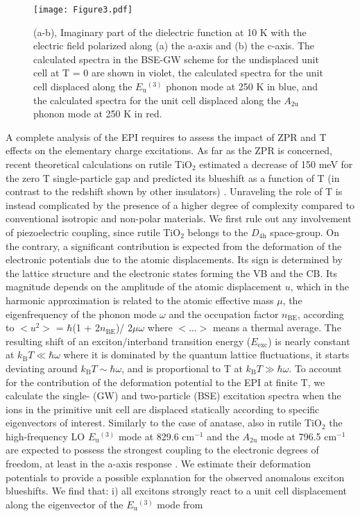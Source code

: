 \documentclass[aps,prl,twocolumn,amsfonts,nobibnotes,superscriptaddress,showpacs]{revtex4-1}
\begin{document}
\begin{figure}[b]
	\begin{center}
		\texttt{[image: Figure3.pdf]}
		\caption{(a-b), Imaginary part of the dielectric function at 10 K with the electric field polarized along (a) the a-axis and (b) the c-axis. The calculated spectra in the BSE-GW scheme for the undisplaced unit cell at T = 0 are shown in violet, the calculated spectra for the unit cell displaced along the $E\mathrm{_u}^{(3)}$ phonon mode at 250 K in blue, and the calculated spectra for the unit cell displaced along the $A\mathrm{_{2u}}$ phonon mode at 250 K in red.}
		\label{fig:Fig3}
	\end{center}
\end{figure}

A complete analysis of the EPI requires to assess the impact of ZPR and T effects on the elementary charge excitations. As far as the ZPR is concerned, recent theoretical calculations on rutile TiO$_2$ estimated a decrease of 150 meV for the zero T single-particle gap and predicted its blueshift as a function of T (in contrast to the redshift shown by other insulators)  \cite{monserrat2016correlation, giustino}. Unraveling the role of T is instead complicated by the presence of a higher degree of complexity compared to conventional isotropic and non-polar materials. We first rule out any involvement of piezoelectric coupling, since rutile TiO$_2$ belongs to the $D\mathrm{_{4h}}$ space-group. On the contrary, a significant contribution is expected from the deformation of the electronic potentials due to the atomic displacements. Its sign is determined by the lattice structure and the electronic states forming the VB and the CB. Its magnitude depends on the amplitude of the atomic displacement $u$, which in the harmonic approximation is related to the atomic effective mass $\mu$, the eigenfrequency of the phonon mode $\omega$ and the occupation factor $n_\mathrm{{BE}}$, according to $<u^2>$ = $\hbar$(1 + 2$n\mathrm{_{BE}}$)/ 2$\mu\omega$ where $<...>$ means a thermal average. The resulting shift of an exciton/interband transition energy ($E_\mathrm{{exc}}$) is nearly constant at $k\mathrm{_B} T \ll \hbar\omega$ where it is dominated by the quantum lattice fluctuations, it starts deviating around $k\mathrm{_B} T \sim \hbar\omega$, and is proportional to T at $k\mathrm{_B} T \gg \hbar\omega$. To account for the contribution of the deformation potential to the EPI at finite T, we calculate the single- (GW) and two-particle (BSE) excitation spectra when the ions in the primitive unit cell are displaced statically according to specific eigenvectors of interest. Similarly to the case of anatase, also in rutile TiO$_2$ the high-frequency LO $E\mathrm{_{u}}^{(3)}$ mode at 829.6 cm$^{-1}$ and the $A\mathrm{_{2u}}$ mode at 796.5 cm$^{-1}$ are expected to possess the strongest coupling to the electronic degrees of freedom, at least in the a-axis response \cite{ref:deskins, moser2013tunable, ref:baldini_TiO2}. We estimate their deformation potentials to provide a possible explanation for the observed anomalous exciton blueshifts. We find that: i) all excitons strongly react to a unit cell displacement along the eigenvector of the $E\mathrm{_{u}}^{(3)}$ mode from 
\end{document}
